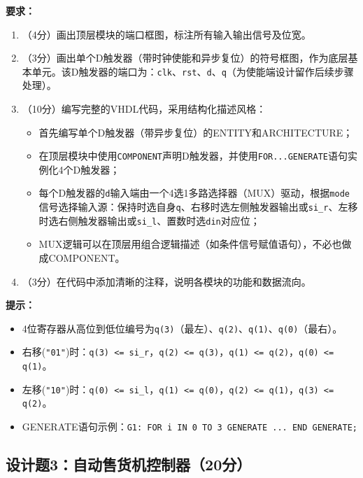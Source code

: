 \textbf{要求：}
\begin{enumerate}[label=(\arabic*)]
  \item （4分）画出顶层模块的端口框图，标注所有输入输出信号及位宽。
  \item （3分）画出单个D触发器（带时钟使能和异步复位）的符号框图，作为底层基本单元。该D触发器的端口为：\texttt{clk}、\texttt{rst}、\texttt{d}、\texttt{q}（为使能端设计留作后续步骤处理）。
  \item （10分）编写完整的VHDL代码，采用结构化描述风格：
  \begin{itemize}
    \item 首先编写单个D触发器（带异步复位）的ENTITY和ARCHITECTURE；
    \item 在顶层模块中使用\texttt{COMPONENT}声明D触发器，并使用\texttt{FOR...GENERATE}语句实例化4个D触发器；
    \item 每个D触发器的\texttt{d}输入端由一个4选1多路选择器（MUX）驱动，根据\texttt{mode}信号选择输入源：保持时选自身\texttt{q}、右移时选左侧触发器输出或\texttt{si\_r}、左移时选右侧触发器输出或\texttt{si\_l}、置数时选\texttt{din}对应位；
    \item MUX逻辑可以在顶层用组合逻辑描述（如条件信号赋值语句），不必也做成COMPONENT。
  \end{itemize}
  \item （3分）在代码中添加清晰的注释，说明各模块的功能和数据流向。
\end{enumerate}

\begin{framed}
\textbf{提示：}
\begin{itemize}
  \item 4位寄存器从高位到低位编号为\texttt{q(3)}（最左）、\texttt{q(2)}、\texttt{q(1)}、\texttt{q(0)}（最右）。
  \item 右移(\texttt{"01"})时：\texttt{q(3) <= si\_r}，\texttt{q(2) <= q(3)}，\texttt{q(1) <= q(2)}，\texttt{q(0) <= q(1)}。
  \item 左移(\texttt{"10"})时：\texttt{q(0) <= si\_l}，\texttt{q(1) <= q(0)}，\texttt{q(2) <= q(1)}，\texttt{q(3) <= q(2)}。
  \item GENERATE语句示例：\texttt{G1: FOR i IN 0 TO 3 GENERATE ... END GENERATE;}
\end{itemize}
\end{framed}

\newpage

\subsection*{设计题3：自动售货机控制器（20分）}

